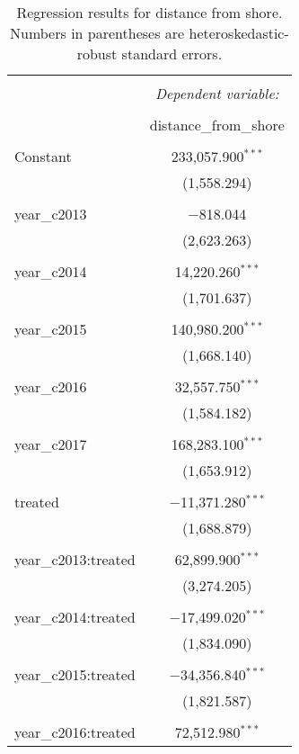 \documentclass[11pt,]{article}
\begin{document}
\begin{table}[!htbp] \centering 
  \caption{\label{tab:dist_shore}Regression results for distance from shore. Numbers in parentheses are heteroskedastic-robust standard errors.} 
  \label{} 
\begin{tabular}{@{\extracolsep{5pt}}lc} 
\\[-1.8ex]\hline 
\hline \\[-1.8ex] 
 & \multicolumn{1}{c}{\textit{Dependent variable:}} \\ 
\cline{2-2} 
\\[-1.8ex] & distance\_from\_shore \\ 
\hline \\[-1.8ex] 
 Constant & 233,057.900$^{***}$ \\ 
  & (1,558.294) \\ 
  & \\ 
 year\_c2013 & $-$818.044 \\ 
  & (2,623.263) \\ 
  & \\ 
 year\_c2014 & 14,220.260$^{***}$ \\ 
  & (1,701.637) \\ 
  & \\ 
 year\_c2015 & 140,980.200$^{***}$ \\ 
  & (1,668.140) \\ 
  & \\ 
 year\_c2016 & 32,557.750$^{***}$ \\ 
  & (1,584.182) \\ 
  & \\ 
 year\_c2017 & 168,283.100$^{***}$ \\ 
  & (1,653.912) \\ 
  & \\ 
 treated & $-$11,371.280$^{***}$ \\ 
  & (1,688.879) \\ 
  & \\ 
 year\_c2013:treated & 62,899.900$^{***}$ \\ 
  & (3,274.205) \\ 
  & \\ 
 year\_c2014:treated & $-$17,499.020$^{***}$ \\ 
  & (1,834.090) \\ 
  & \\ 
 year\_c2015:treated & $-$34,356.840$^{***}$ \\ 
  & (1,821.587) \\ 
  & \\ 
 year\_c2016:treated & 72,512.980$^{***}$ \\ 

\end{tabular}
\end{table}
\end{document}
